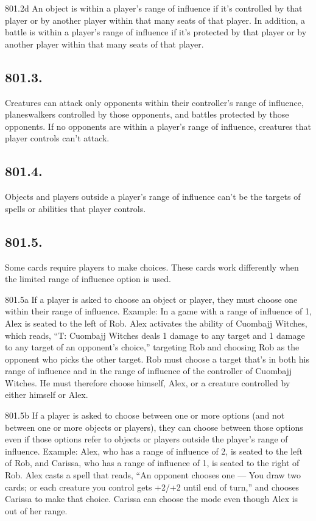 801.2d An object is within a player’s range of influence if it’s controlled by that player or by another player within that many seats of that player. In addition, a battle is within a player’s range of influence if it’s protected by that player or by another player within that many seats of that player.

\subsection*{801.3.}
Creatures can attack only opponents within their controller’s range of influence, planeswalkers controlled by those opponents, and battles protected by those opponents. If no opponents are within a player’s range of influence, creatures that player controls can’t attack.

\subsection*{801.4.}
Objects and players outside a player’s range of influence can’t be the targets of spells or abilities that player controls.

\subsection*{801.5.}
Some cards require players to make choices. These cards work differently when the limited range of influence option is used.

801.5a If a player is asked to choose an object or player, they must choose one within their range of influence.
Example: In a game with a range of influence of 1, Alex is seated to the left of Rob. Alex activates the ability of Cuombajj Witches, which reads, “{T}: Cuombajj Witches deals 1 damage to any target and 1 damage to any target of an opponent’s choice,” targeting Rob and choosing Rob as the opponent who picks the other target. Rob must choose a target that’s in both his range of influence and in the range of influence of the controller of Cuombajj Witches. He must therefore choose himself, Alex, or a creature controlled by either himself or Alex.

801.5b If a player is asked to choose between one or more options (and not between one or more objects or players), they can choose between those options even if those options refer to objects or players outside the player’s range of influence.
Example: Alex, who has a range of influence of 2, is seated to the left of Rob, and Carissa, who has a range of influence of 1, is seated to the right of Rob. Alex casts a spell that reads, “An opponent chooses one — You draw two cards; or each creature you control gets +2/+2 until end of turn,” and chooses Carissa to make that choice. Carissa can choose the mode even though Alex is out of her range.

